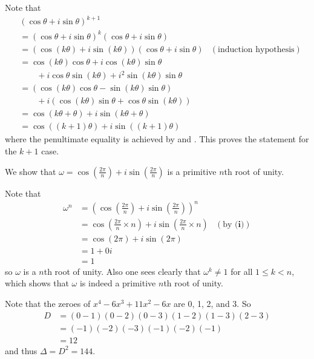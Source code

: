 \begin{questions}
\begin{partquestions}{\roman*}
        Note that
        {
            \fontsize{9.5pt}{11pt}\selectfont
            \begin{align*}
                &(\cos\theta + i\sin\theta)^{k+1}\\
                &= (\cos\theta + i\sin\theta)^k(\cos\theta + i\sin\theta)\\
                &= (\cos(k\theta) + i\sin(k\theta))(\cos\theta + i\sin\theta) & (\text{induction hypothesis})\\
                &= \cos(k\theta)\cos\theta + i\cos(k\theta)\sin\theta\\
                &\quad\quad+ i\cos\theta\sin(k\theta) + i^2\sin(k\theta)\sin\theta\\
                &= (\cos(k\theta)\cos\theta - \sin(k\theta)\sin\theta)\\
                &\quad\quad+ i(\cos(k\theta)\sin\theta + \cos\theta\sin(k\theta))\\
                &= \cos(k\theta+\theta) + i\sin(k\theta+\theta)\\
                &= \cos((k+1)\theta) + i\sin((k+1)\theta)
            \end{align*}
        }
        where the penultimate equality is achieved by  and . This proves the statement for the $k + 1$ case.

        \item We show that $\omega = \cos\left(\frac{2\pi}n\right) + i\sin\left(\frac{2\pi}n\right)$ is a primitive $n$th root of unity.

        Note that
        \begin{align*}
            \omega^n &= \left(\cos\left(\frac{2\pi}n\right) + i\sin\left(\frac{2\pi}n\right)\right)^n\\
            &= \cos\left(\frac{2\pi}n\times n\right) + i\sin\left(\frac{2\pi}n\times n\right) & (\text{by }\textbf{(i)})\\
            &= \cos(2\pi) + i\sin(2\pi)\\
            &= 1 + 0i\\
            &= 1
        \end{align*}
        so $\omega$ is a $n$th root of unity. Also one sees clearly that $\omega^k \neq 1$ for all $1 \leq k < n$, which shows that $\omega$ is indeed a primitive $n$th root of unity.
    \end{partquestions}

    \item \begin{partquestions}{\roman*}
        \item Note that the zeroes of $x^4 - 6x^3 + 11x^2 - 6x$ are 0, 1, 2, and 3. So
        \begin{align*}
            D &= (0-1)(0-2)(0-3)(1-2)(1-3)(2-3)\\
            &= (-1)(-2)(-3)(-1)(-2)(-1)\\
            &= 12
        \end{align*}
        and thus $\Delta = D^2 = 144$.


\end{partquestions}
\end{questions}
